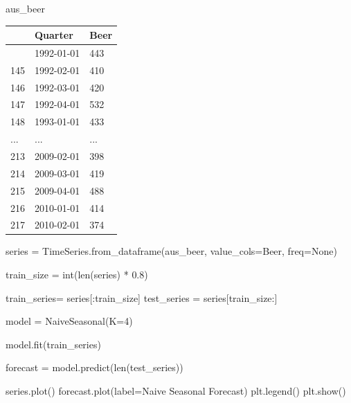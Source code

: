 \documentclass[
  11pt,
]{article}
\newenvironment{Shaded}{\begin{snugshade}}{\end{snugshade}}
\newcommand{\BuiltInTok}[1]{\textcolor[rgb]{0.00,0.23,0.31}{#1}}
\newcommand{\DecValTok}[1]{\textcolor[rgb]{0.68,0.00,0.00}{#1}}
\newcommand{\FloatTok}[1]{\textcolor[rgb]{0.68,0.00,0.00}{#1}}
\newcommand{\NormalTok}[1]{\textcolor[rgb]{0.00,0.23,0.31}{#1}}
\newcommand{\OperatorTok}[1]{\textcolor[rgb]{0.37,0.37,0.37}{#1}}
\newcommand{\StringTok}[1]{\textcolor[rgb]{0.13,0.47,0.30}{#1}}
\newcommand{\VariableTok}[1]{\textcolor[rgb]{0.07,0.07,0.07}{#1}}
\begin{document}
\begin{Shaded}
\begin{Highlighting}[]
\NormalTok{aus\_beer}
\end{Highlighting}
\end{Shaded}

\begin{longtable}[]{@{}lll@{}}
\toprule\noalign{}
& Quarter & Beer \\
\midrule\noalign{}
\endhead
\bottomrule\noalign{}
\endlastfoot
144 & 1992-01-01 & 443 \\
145 & 1992-02-01 & 410 \\
146 & 1992-03-01 & 420 \\
147 & 1992-04-01 & 532 \\
148 & 1993-01-01 & 433 \\
... & ... & ... \\
213 & 2009-02-01 & 398 \\
214 & 2009-03-01 & 419 \\
215 & 2009-04-01 & 488 \\
216 & 2010-01-01 & 414 \\
217 & 2010-02-01 & 374 \\
\end{longtable}

\begin{Shaded}
\begin{Highlighting}[]

\NormalTok{series }\OperatorTok{=}\NormalTok{ TimeSeries.from\_dataframe(aus\_beer, value\_cols}\OperatorTok{=}\StringTok{\textquotesingle{}Beer\textquotesingle{}}\NormalTok{, freq}\OperatorTok{=}\VariableTok{None}\NormalTok{)}
\end{Highlighting}
\end{Shaded}

\begin{Shaded}
\begin{Highlighting}[]

\NormalTok{train\_size }\OperatorTok{=} \BuiltInTok{int}\NormalTok{(}\BuiltInTok{len}\NormalTok{(series) }\OperatorTok{*} \FloatTok{0.8}\NormalTok{)}

\NormalTok{train\_series}\OperatorTok{=}\NormalTok{ series[:train\_size]}
\NormalTok{test\_series }\OperatorTok{=}\NormalTok{ series[train\_size:]}

\NormalTok{model }\OperatorTok{=}\NormalTok{ NaiveSeasonal(K}\OperatorTok{=}\DecValTok{4}\NormalTok{)}

\NormalTok{model.fit(train\_series)}

\NormalTok{forecast }\OperatorTok{=}\NormalTok{ model.predict(}\BuiltInTok{len}\NormalTok{(test\_series))}

\NormalTok{series.plot()}
\NormalTok{forecast.plot(label}\OperatorTok{=}\StringTok{\textquotesingle{}Naive Seasonal Forecast\textquotesingle{}}\NormalTok{)}
\NormalTok{plt.legend()}
\NormalTok{plt.show()}
\end{Highlighting}
\end{Shaded}
\end{document}
